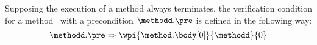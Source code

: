 Supposing the execution of a method always terminates, the verification condition for a method \methodd \ with a
 precondition $\methodd.\pre$ is defined in the following way:
$$ \methodd.\pre \Rightarrow \wpi{\method.\body[0]}{\methodd}{0}$$






